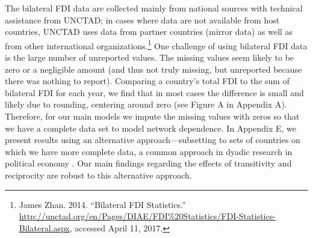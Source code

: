 \documentclass[reqno,onecolumn,letterpaper,12pt]{article}
\begin{document}
The bilateral FDI data are collected mainly from national sources with technical assistance from UNCTAD; in cases where data are not available from host countries, UNCTAD uses data from partner countries (mirror data) as well as from other international organizations.\footnote{James Zhan. 2014. ``Bilateral FDI Statistics.'' \url{http://unctad.org/en/Pages/DIAE/FDI\%20Statistics/FDI-Statistics-Bilateral.aspx}, accessed April 11, 2017.} One challenge of using bilateral FDI data is the large number of unreported values. %
The missing values seem likely to be zero or a negligible amount (and thus not truly missing, but unreported because there was nothing to report). Comparing a country's total FDI to the sum of bilateral FDI for each year, we find that in most cases the difference is small and likely due to rounding, centering around zero (see Figure A in Appendix A). Therefore, for our main models we impute the missing values with zeros so that we have a complete data set to model network dependence.  In Appendix E, we present results using an alternative approach---subsetting to sets of countries on which we have more complete data, a common approach in dyadic research in political economy \citep[e.g., ][]{cao2014democracies,pettersson2013aid}. Our main findings regarding the effects of transitivity and reciprocity are robust to this alternative approach.  %
\end{document}
